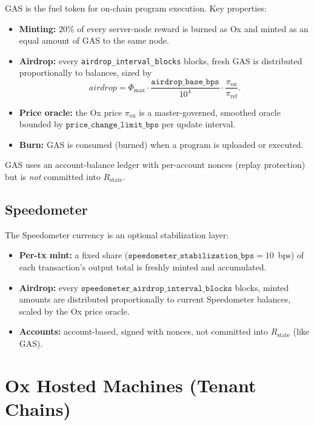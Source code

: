 \documentclass[11pt,a4paper]{article}
\theoremstyle{definition}
\newcommand{\ox}{\textsf{Ox}}
\newcommand{\gas}{\textsf{GAS}}
\begin{document}
\gas{} is the fuel token for on-chain program execution.  Key properties:
\begin{itemize}[leftmargin=2em]
  \item \textbf{Minting:} $20\%$ of every server-node reward is burned as \ox{}
    and minted as an equal amount of \gas{} to the same node.
  \item \textbf{Airdrop:} every \texttt{airdrop\_interval\_blocks} blocks, fresh
    \gas{} is distributed proportionally to balances, sized by
    \[
    \mathit{airdrop} = \Phi_{\max}\cdot\frac{\texttt{airdrop\_base\_bps}}{10^4}\cdot
      \frac{\pi_{\mathrm{ox}}}{\pi_{\mathrm{ref}}}.
    \]
  \item \textbf{Price oracle:} the \ox{} price $\pi_{\mathrm{ox}}$ is a
    master-governed, smoothed oracle bounded by
    $\texttt{price\_change\_limit\_bps}$ per update interval.
  \item \textbf{Burn:} \gas{} is consumed (burned) when a program is uploaded
    or executed.
\end{itemize}
\gas{} uses an account-balance ledger with per-account nonces (replay
protection) but is \emph{not} committed into $R_{\mathrm{state}}$.

\subsection{Speedometer}
\label{sec:speedometer}

The Speedometer currency is an optional stabilization layer:
\begin{itemize}[leftmargin=2em]
  \item \textbf{Per-tx mint:} a fixed share
    ($\texttt{speedometer\_stabilization\_bps} = 10$~bps) of each transaction's
    output total is freshly minted and accumulated.
  \item \textbf{Airdrop:} every
    $\texttt{speedometer\_airdrop\_interval\_blocks}$ blocks, minted amounts are
    distributed proportionally to current Speedometer balances, scaled by the
    Ox price oracle.
  \item \textbf{Accounts:} account-based, signed with nonces, not committed
    into $R_{\mathrm{state}}$ (like \gas{}).
\end{itemize}

\section{Ox Hosted Machines (Tenant Chains)}
\label{sec:ohm}
\end{document}
